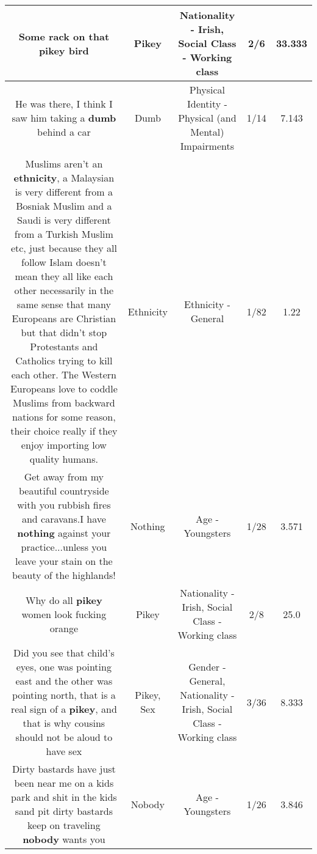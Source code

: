 \documentclass[11pt]{article}
\newlength\mylength
\begin{document}
\begin{center}
\begin{longtable}{|C{.65\mylength}|C{.30\mylength}|C{.12\mylength}|C{.12\mylength}|C{.12\mylength}|}
  \small Some rack on that \textbf{p\textbf{ikey}} bird\normalsize   & Pikey & Nationality - Irish, Social Class - Working class & 2/6 & 33.333 \\  \hline
  \small He was there, I think I saw him taking a \textbf{dumb} behind a car\normalsize   & Dumb & Physical Identity - Physical (and Mental) Impairments & 1/14 & 7.143 \\  \hline
  \small Muslims aren't an \textbf{ethnicity}, a Malaysian is very different from a Bosniak Muslim and a Saudi is very different from a Turkish Muslim etc,  just because they all follow Islam doesn't mean they all like each other necessarily in the same sense that many Europeans are Christian but that didn't stop Protestants and Catholics trying to kill each other. The Western Europeans love to coddle Muslims from backward nations for some reason, their choice really if they enjoy importing low quality humans.\normalsize   & Ethnicity & Ethnicity - General & 1/82 & 1.22 \\  \hline
  \small Get away from my beautiful countryside with you rubbish fires and caravans.I have \textbf{nothing} against your practice...unless you leave your stain on the beauty of the highlands!\normalsize   & Nothing & Age - Youngsters & 1/28 & 3.571 \\  \hline
  \small Why do all \textbf{p\textbf{ikey}} women look fucking orange\normalsize   & Pikey & Nationality - Irish, Social Class - Working class & 2/8 & 25.0 \\  \hline
  \small Did you see that child's eyes, one was pointing east and the other was pointing north, that is a real sign of a \textbf{p\textbf{ikey}}, and that is why cousins should not be aloud to have sex\normalsize   & Pikey, Sex & Gender - General, Nationality - Irish, Social Class - Working class & 3/36 & 8.333 \\  \hline
  \small Dirty bastards have just been near me on a kids park and shit in the kids sand pit dirty bastards keep on traveling \textbf{nobody} wants you\normalsize   & Nobody & Age - Youngsters & 1/26 & 3.846 \\  \hline

\end{longtable}
\end{center}
\end{document}
